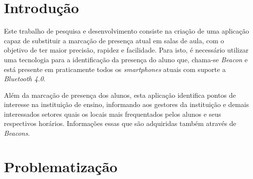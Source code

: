 \documentclass[
	12pt,
	oneside,
	a4paper,
	english,
	brazil,
]{abntex2}
\begin{document}
\frenchspacing 


\imprimircapa

\imprimirfolhaderosto


\tableofcontents*


\newpage
\textual

\chapter*[Introdução]{Introdução}

Este trabalho de pesquisa e desenvolvimento consiste na criação de uma aplicação capaz de substituir a marcação de presença atual em salas de aula, com o objetivo de ter maior precisão, rapidez e facilidade. Para isto, é necessário utilizar uma tecnologia para a identificação da presença do aluno que, chama-se \emph{Beacon} e está presente em praticamente todos os \emph{smartphones} atuais com suporte a \emph{Bluetooth 4.0}.

Além da marcação de presença dos alunos, esta aplicação identifica pontos de interesse na instituição de ensino, informando aos gestores da instituição e demais interessados setores quais os locais mais frequentados pelos alunos e seus respectivos horários. Informações essas que são adquiridas também através de \emph{Beacons}.


\chapter{Problematização}
\end{document}
